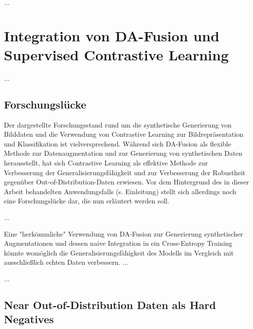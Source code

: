 ...

\section{Integration von DA-Fusion und Supervised Contrastive Learning}

...

\subsection{Forschungslücke}

Der dargestellte Forschungsstand rund um die synthetische Generierung von Bilddaten und die Verwendung von Contrastive Learning zur Bildrepräsentation und Klassifikation ist vielversprechend. Während sich DA-Fusion als flexible Methode zur Datenaugmentation und zur Generierung von synthetischen Daten herausstellt, hat sich Contrastive Learning als effektive Methode zur Verbesserung der Generalisierungsfähigkeit und zur Verbesserung der Robustheit gegenüber Out-of-Distribution-Daten erwiesen. Vor dem Hintergrund des in dieser Arbeit behandelten Anwendungsfalls (s. Einleitung) stellt sich allerdings noch eine Forschungslücke dar, die nun erläutert werden soll.

...

Eine "herkömmliche" Verwendung von DA-Fusion zur Generierung synthetischer Augmentationen und dessen naive Integration in ein Cross-Entropy Training könnte womöglich die Generalisierungsfähigkeit des Modells im Vergleich mit ausschließlich echten Daten verbessern. ...

...

\subsection{Near Out-of-Distribution Daten als Hard Negatives}


